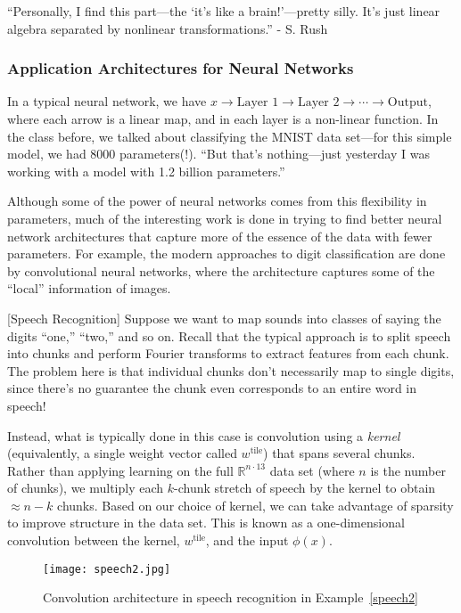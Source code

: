 \documentclass{article}
\begin{document}
``Personally, I find this part---the `it's like a brain!'---pretty silly. It's just linear algebra separated by nonlinear transformations.'' - S. Rush

\subsubsection{Application Architectures for Neural Networks}

In a typical neural network, we have $x\to\text{Layer 1}\to\text{Layer 2}\to\cdots\to\text{Output}$, where each arrow is a linear map, and in each layer is a non-linear function. In the class before, we talked about classifying the MNIST data set---for this simple model, we had 8000 parameters(!). ``But that's nothing---just yesterday I was working with a model with 1.2 billion parameters.''

Although some of the power of neural networks comes from this flexibility in parameters, much of the interesting work is done in trying to find better neural network architectures that capture more of the essence of the data with fewer parameters. For example, the modern approaches to digit classification are done by convolutional neural networks, where the architecture captures some of the ``local'' information of images.

\begin{example}
\label{speech2}
  [Speech Recognition]
  Suppose we want to map sounds into classes of saying the digits ``one,'' ``two,'' and so on. Recall that the typical approach is to split speech into chunks and perform Fourier transforms to extract features from each chunk.  The problem here is that individual chunks don't necessarily map to single digits, since there's no guarantee the chunk even corresponds to an entire word in speech!

  Instead, what is typically done in this case is convolution using a \emph{kernel} (equivalently, a single weight vector called $w^{\text{tile}}$) that spans several chunks.  Rather than applying learning on the full $\mathbb{R}^{n \cdot 13}$ data set (where $n$ is the number of chunks), we multiply each $k$-chunk stretch of speech by the kernel to obtain $\approx n - k$ chunks.  Based on our choice of kernel, we can take advantage of sparsity to improve structure in the data set.  This is known as a one-dimensional convolution between the kernel, $w^{\text{tile}}$, and the input $\phi(x)$.

    \begin{figure}[!ht]
    \centering
    \texttt{[image: speech2.jpg]}
    \caption{Convolution architecture in speech recognition in Example~\ref{speech2}}
    \end{figure}
\end{example}
\end{document}
